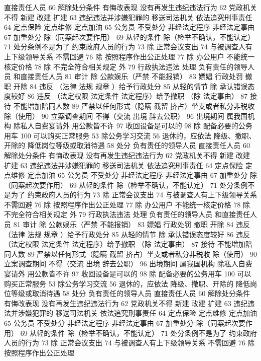 \documentclass[11pt]{ctexart}
\begin{document}
直接责任人员
60 解除处分条件
有悔改表现
没有再发生违纪违法行为
62 党政机关不得
新建 改建 扩建
63 违纪违法并涉嫌犯罪的
移送司法机关
依法追究刑事责任
64 定点保险 定点维修 定点加油
65 公务员 不受处分
非经法定程序
非经法定事由
67 加重处分
除（同案起次要作用）
69 从轻的条件
除（检举不确认，不能认定）
71 处分条例不是为了
约束政府人员的行为
73 除 正常会议支出
74 与被调查人有上下级领导关系 不需回避
76 除 按照程序作出公正处理
77 除 办公用户
不能统一核定价格
78 除 不完全符合相关规定 外
79 行政执法违法 处理
负有责任的领导人员
和直接责任人员
81 审计
除 公款娱乐（严禁 不能报销）
83 嫖娼 行政处罚
撤职 开除
84 违反 （法律 法规 规章 ）给予行政处分
85 从轻的情节
除 承认错误态度较好
86 违反 （法定权限 法定条件 法定程序）给予撤职
（除 法定事由）
87 接待 不能增加陪同人数
89 严禁以任何形式（隐瞒 截留 挤占）坐支或者私分非税收
除（使用）
90 立案调查期间 不得（交流 出境 辞去公职）
96 出境期间 属我国机构 除私人自费宴请外 用公款皆不许
97 收回设备是可以的
98 除 配备必要的公务用车
100 可以购买正常服务
53 除公务学习交流
56 退休的，应依法
降级、撤职、开除的 降低岗位等级或取消待遇
58 处分
负有责任的领导人员
直接责任人员
60 解除处分条件
有悔改表现
没有再发生违纪违法行为
62 党政机关不得
新建 改建 扩建
63 违纪违法并涉嫌犯罪的
移送司法机关
依法追究刑事责任
64 定点保险 定点维修 定点加油
65 公务员 不受处分
非经法定程序
非经法定事由
67 加重处分
除（同案起次要作用）
69 从轻的条件
除（检举不确认，不能认定）
71 处分条例不是为了
约束政府人员的行为
73 除 正常会议支出
74 与被调查人有上下级领导关系 不需回避
76 除 按照程序作出公正处理
77 除 办公用户
不能统一核定价格
78 除 不完全符合相关规定 外
79 行政执法违法 处理
负有责任的领导人员
和直接责任人员
81 审计
除 公款娱乐（严禁 不能报销）
83 嫖娼 行政处罚
撤职 开除
84 违反 （法律 法规 规章 ）给予行政处分
85 从轻的情节
除 承认错误态度较好
86 违反 （法定权限 法定条件 法定程序）给予撤职
（除 法定事由）
87 接待 不能增加陪同人数
89 严禁以任何形式（隐瞒 截留 挤占）坐支或者私分非税收
除（使用）
90 立案调查期间 不得（交流 出境 辞去公职）
96 出境期间 属我国机构 除私人自费宴请外 用公款皆不许
97 收回设备是可以的
98 除 配备必要的公务用车
100 可以购买正常服务
53 除公务学习交流
56 退休的，应依法
降级、撤职、开除的 降低岗位等级或取消待遇
58 处分
负有责任的领导人员
直接责任人员
60 解除处分条件
有悔改表现
没有再发生违纪违法行为
62 党政机关不得
新建 改建 扩建
63 违纪违法并涉嫌犯罪的
移送司法机关
依法追究刑事责任
64 定点保险 定点维修 定点加油
65 公务员 不受处分
非经法定程序
非经法定事由
67 加重处分
除（同案起次要作用）
69 从轻的条件
除（检举不确认，不能认定）
71 处分条例不是为了
约束政府人员的行为
73 除 正常会议支出
74 与被调查人有上下级领导关系 不需回避
76 除 按照程序作出公正处理
\end{document}
